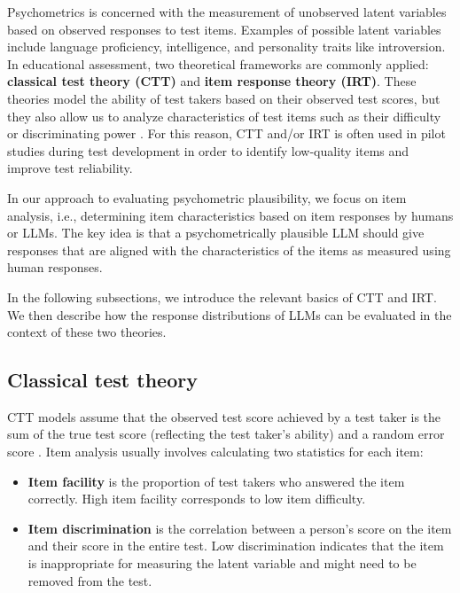 \documentclass[11pt]{article}
\begin{document}
Psychometrics is concerned with the measurement of unobserved latent variables based on observed responses to test items. Examples of possible latent variables include language proficiency, intelligence, and personality traits like introversion. In educational assessment, two theoretical frameworks are commonly applied: \textbf{classical test theory (CTT)} and \textbf{item response theory (IRT)}. These theories model the ability of test takers based on their observed test scores, but they also allow us to analyze characteristics of test items such as their difficulty or discriminating power \citep{Livingston2011}. For this reason, CTT and/or IRT is often used in pilot studies during test development in order to identify low-quality items and improve test reliability.

In our approach to evaluating psychometric plausibility, we focus on item analysis, i.e., determining item characteristics based on item responses by humans or LLMs. The key idea is that a psychometrically plausible LLM should give responses that are aligned with the characteristics of the items as measured using human responses.

In the following subsections, we introduce the relevant basics of CTT and IRT. We then describe how the response distributions of LLMs can be evaluated in the context of these two theories.

\subsection{Classical test theory}

CTT models assume that the observed test score achieved by a test taker is the sum of the true test score (reflecting the test taker's ability) and a random error score \citep{Hambleton1993}. Item analysis usually involves calculating two statistics for each item:

\begin{itemize}
  \item \textbf{Item facility} is the proportion of test takers who answered the item correctly. High item facility corresponds to low item difficulty.
  \item \textbf{Item discrimination} is the correlation between a person's score on the item and their score in the entire test. Low discrimination indicates that the item is inappropriate for measuring the latent variable and might need to be removed from the test.
\end{itemize}
\end{document}
